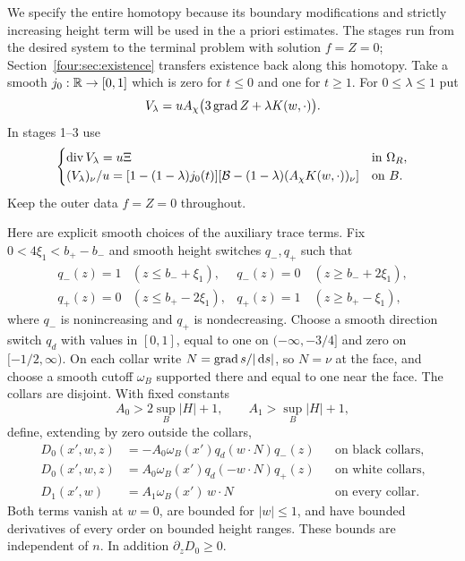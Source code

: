 We specify the entire homotopy because its boundary modifications and
strictly increasing height term will be used in the a priori estimates.
The stages run from the desired system to the terminal problem with
solution $f=Z=0$; Section~\ref{four:sec:existence} transfers existence back
along this homotopy.  Take a smooth
$j_0:\mathbb R\to[0,1]$ which is zero for $t\le0$ and one for $t\ge1$.
For $0\le\lambda\le1$ put
\[
 V_\lambda=uA_\chi\bigl(3\operatorname{grad} Z+\lambda K(w,\cdot)\bigr).
\]
In stages 1--3 use
\begin{equation}\label{four:eq:homotopy-flux}
\begin{cases}
 \operatorname{div} V_\lambda=u\Xi &\text{in }\Omega_R,\\
 (V_\lambda)_\nu/u=
 [1-(1-\lambda)j_0(t)]
 [\mathcal B-(1-\lambda)(A_\chi K(w,\cdot))_\nu]
 &\text{on }B.
\end{cases}
\end{equation}
Keep the outer data $f=Z=0$ throughout.

Here are explicit smooth choices of the auxiliary trace terms.  Fix
$0<4\xi_1<b_+-b_-$ and smooth height switches $q_-,q_+$ such that
\[
\begin{array}{lll}
 q_-(z)=1 &(z\le b_-+\xi_1),&q_-(z)=0\quad(z\ge b_-+2\xi_1),\\
 q_+(z)=0 &(z\le b_+-2\xi_1),&q_+(z)=1\quad(z\ge b_+-\xi_1),
\end{array}
\]
where $q_-$ is nonincreasing and $q_+$ is nondecreasing.  Choose a smooth
direction switch $q_d$ with values in $[0,1]$, equal to one on
$(-\infty,-3/4]$ and zero on $[-1/2,\infty)$.  On each collar write
$N=\operatorname{grad} s/|\,\mathrm d s|$, so $N=\nu$ at the face, and choose a smooth cutoff $\omega_B$ supported
there and equal to one near the face.  The collars are disjoint.  With
fixed constants
\[
 A_0>2\sup_B|H|+1,\qquad A_1>\sup_B|H|+1,
\]
define, extending by zero outside the collars,
\begin{equation}\label{four:sys:switches}
\begin{aligned}
 D_0(x',w,z)
  &=-A_0\omega_B(x')q_d(w\cdot N)q_-(z)
                      &&\text{on black collars},\\
 D_0(x',w,z)
  &= A_0\omega_B(x')q_d(-w\cdot N)q_+(z)
                      &&\text{on white collars},\\
 D_1(x',w)&=A_1\omega_B(x')\,w\cdot N
                      &&\text{on every collar}.
\end{aligned}
\end{equation}
Both terms vanish at $w=0$, are bounded for $|w|\le1$, and have bounded
derivatives of every order on bounded height ranges.  These bounds are
independent of $n$.  In addition $\partial_zD_0\ge0$.

